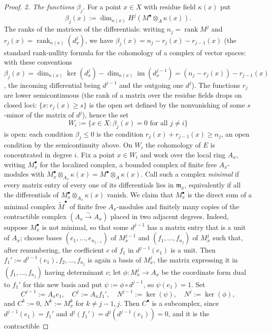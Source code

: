 \begin{proof}
\emph{2. The functions $\beta_j$.}  For a point $x\in X$ with residue
field $\kappa(x)$ put
\[
\beta_j(x):=\dim_{\kappa(x)}H^j(M^{\bullet}\otimes_A\kappa(x)).
\]
The ranks of the matrices of the differentials: writing
$n_j=\operatorname{rank}M^j$ and $r_j(x)=\operatorname{rank}_{\kappa(x)}
(d^{j}_{x})$, we have
$\beta_j(x)=n_j-r_j(x)-r_{j-1}(x)$ (the standard rank-nullity formula
for the cohomology of a complex of vector spaces: with these
conventions
$\beta_j(x)=\dim_{\kappa(x)}\ker(d^j_x)-\dim_{\kappa(x)}
\operatorname{im}(d^{j-1}_x)=(n_j-r_j(x))-r_{j-1}(x)$, the incoming
differential being $d^{j-1}$ and the outgoing one $d^j$).  The
functions $r_j$ are lower semicontinuous (the rank of a matrix over
the residue fields drops on closed loci: $\{x:r_j(x)\ge s\}$ is the
open set defined by the nonvanishing of some $s$-minor of the matrix
of $d^j$), hence the set
\[
W_i:=\{x\in X:\beta_j(x)=0\text{ for all }j\ne i\}
\]
is open: each condition $\beta_j\le0$ is the condition
$r_j(x)+r_{j-1}(x)\ge n_j$, an open condition by the semicontinuity
above.
On $W_i$ the cohomology of $E$ is concentrated in degree $i$.  Fix a
point $x\in W_i$ and work over the local ring $A_x$, writing
$M^{\bullet}_x$ for the localized complex, a bounded complex of finite
free $A_x$-modules with
$M^{\bullet}_x\otimes_{A_x}\kappa(x)=M^{\bullet}\otimes_A\kappa(x)$.
Call such a complex \emph{minimal} if every matrix entry of every one
of its differentials lies in $\mathfrak m_x$, equivalently if all the
differentials of $M^{\bullet}_x\otimes_{A_x}\kappa(x)$ vanish.  We
claim that $M^{\bullet}_x$ is the direct sum of a minimal complex
$\widetilde M^{\bullet}$ of finite free $A_x$-modules and finitely
many copies of the contractible complex $(A_x\xrightarrow{\sim}A_x)$
placed in two adjacent degrees.  Indeed, suppose $M^{\bullet}_x$ is
not minimal, so that some $d^{j-1}$ has a matrix entry that is a unit
of $A_x$; choose bases $(e_1,\dots,e_{n_{j-1}})$ of $M^{j-1}_x$ and
$(f_1,\dots,f_{n_j})$ of $M^{j}_x$ such that, after renumbering, the
coefficient $c$ of $f_1$ in $d^{j-1}(e_1)$ is a unit.  Then
$f_1':=d^{j-1}(e_1),f_2,\dots,f_{n_j}$ is again a basis of $M^j_x$,
the matrix expressing it in $(f_1,\dots,f_{n_j})$ having determinant
$c$; let $\phi:M^j_x\to A_x$ be the coordinate form dual to $f_1'$ for
this new basis and put $\psi:=\phi\circ d^{j-1}$, so $\psi(e_1)=1$.
Set
\[
C^{j-1}:=A_xe_1,\quad C^{j}:=A_xf_1',\quad
N^{j-1}:=\ker(\psi),\quad N^{j}:=\ker(\phi),
\]
and $C^{k}:=0$, $N^{k}:=M^{k}_x$ for $k\ne j-1,j$.  Then $C^{\bullet}$
is a subcomplex, since $d^{j-1}(e_1)=f_1'$ and
$d^{j}(f_1')=d^{j}(d^{j-1}(e_1))=0$, and it is the contractible

\end{proof}
